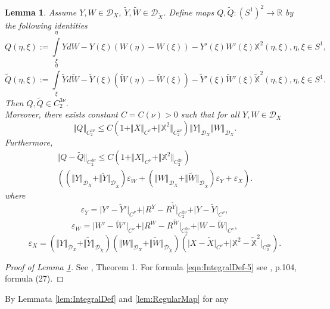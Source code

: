 \documentclass[11pt,a4paper,leqno]{amsart}%
\theoremstyle{plain}
\theoremstyle{remark}
\theoremstyle{plain}
\newtheorem{lemma}[theorem]{Lemma}
\numberwithin{equation}{section}
\newcommand{\eps}{\varepsilon}
\def\Rnu{{\mathbb R}}
\def\intl{\int\limits}
\begin{document}
\begin{lemma}\label{lem:IntegralProp}
Assume $Y,W\in \mathcal{D}_X$, $\tilde{Y},\tilde{W}\in
\mathcal{D}_{\tilde{X}}$. Define maps $Q,\tilde{Q}:(S^1)^2\to\Rnu$ by
the following identities
\begin{equation}
Q(\eta,\xi):=\intl_{\xi}^{\eta}YdW-Y(\xi)(W(\eta)-W(\xi))-Y'(\xi)W'(\xi)\mathbb{X}^2(\eta,\xi),\eta,\xi\in
S^1,\label{eqn:IntegralDef-2}
\end{equation}
\begin{equation}
\tilde{Q}(\eta,\xi):=\intl_{\xi}^{\eta}\tilde{Y}d\tilde{W}-\tilde{Y}(\xi)(\tilde{W}(\eta)-\tilde{W}(\xi))-\tilde{Y}'(\xi)\tilde{W}'(\xi)\tilde{\mathbb{X}}^2(\eta,\xi),\eta,\xi\in
S^1. \label{eqn:IntegralDef-4}
\end{equation}
Then $Q,\tilde{Q}\in C_2^{3\nu}$. \\
Moreover, there exists constant
$C=C(\nu)>0$ such that for all $Y,W\in \mathcal{D}_X$
\begin{equation}
\Vert Q\Vert_{C_2^{3\nu}}\leq
C(1+\Vert X\Vert_{C^{\nu}}+\Vert \mathbb{X}^2\Vert_{C_2^{2\nu}})\Vert Y\Vert_{\mathcal{D}_X}\Vert W\Vert_{\mathcal{D}_X}.\label{eqn:IntegralDef-3}
\end{equation}
Furthermore,
\begin{multline}\label{eqn:IntegralDef-5}
\Vert Q-\tilde{Q}\Vert_{C_2^{3\nu}}\leq
C(1+\Vert X\Vert_{C^{\nu}}+\Vert \mathbb{X}^2\Vert_{C_2^{2\nu}})\\
((\Vert Y\Vert_{\mathcal{D}_X}+\Vert \tilde{Y}\Vert_{\mathcal{D}_{\tilde{X}}})\eps_W+
(\Vert W\Vert_{\mathcal{D}_X}+\Vert \tilde{W}\Vert_{\mathcal{D}_{\tilde{X}}})\eps_Y+\eps_X).
\end{multline}
where
\[
\eps_Y=\vert Y'-\tilde{Y}'\vert_{C^{\nu}}+\vert R^Y-R^{\tilde{Y}}\vert_{C_2^{2\nu}}+\vert Y-\tilde{Y}\vert_{C^{\nu}},
\]
\[
\eps_W=\vert W'-\tilde{W}'\vert_{C^{\nu}}+\vert R^W-R^{\tilde{W}}\vert_{C_2^{2\nu}}+\vert W-\tilde{W}\vert_{C^{\nu}},
\]
\[
\eps_X=(\Vert Y\Vert_{\mathcal{D}_X}+\Vert \tilde{Y}\Vert_{\mathcal{D}_{\tilde{X}}})(\Vert W\Vert_{\mathcal{D}_X}+\Vert \tilde{W}\Vert_{\mathcal{D}_{\tilde{X}}})
(\vert X-\tilde{X}\vert_{C^{\nu}}+\vert \mathbb{X}^2-\mathbb{\tilde{X}}^2\vert_{C_2^{2\nu}}).
\]
\end{lemma}
\begin{proof}[ Proof of Lemma \ref{lem:IntegralProp}]
See \cite{[Gubinelli-2004]}, Theorem 1. For formula
\eqref{eqn:IntegralDef-5} see   \cite{[Gubinelli-2004]}, p.104,
formula (27).
\end{proof}
By Lemmata \ref{lem:IntegralDef} and \ref{lem:RegularMap} for any
\end{document}

